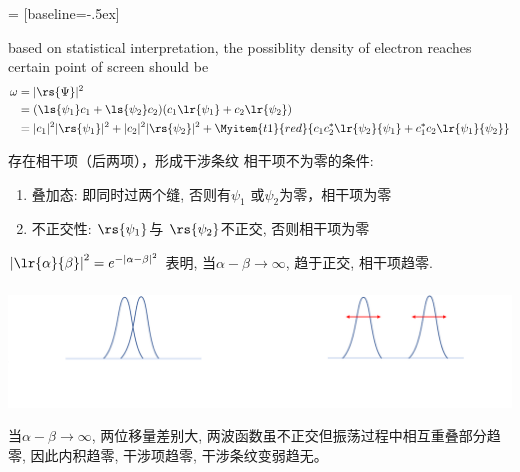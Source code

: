 \begin{frame}
     = [baseline=-.5ex]
    \begin{itemize}
        \Item based on statistical interpretation, the possiblity density of electron reaches certain point of screen should be
        \begin{equation*}
        \begin{split}
            \omega &=|\rs{\Psi}|^2 \\
            &= (\ls{\psi_1}c_1 + \ls{\psi_2}c_2 ) (c_1 \lr{\psi_1}+ c_2\lr{\psi_2}) \\
            & = |c_1|^2 |\rs{\psi_1}|^2 + |c_2|^2 |\rs{\psi_2}|^2  
            + \Myitem{t1}{red}{c_1 c_2 ^* \lr{\psi_2}{\psi_1} + c_1 ^* c_2 \lr{\psi_1}{\psi_2} } \\
        \end{split} 
        \end{equation*}
    \end{itemize}
    \begin{itemize}
        \Item 存在相干项（后两项），形成干涉条纹
        \Item 相干项不为零的条件: 
        \begin{enumerate}
            \item 叠加态: 即同时过两个缝, 否则有$\psi_1$ 或$\psi_2$为零，相干项为零
            \item 不正交性: $\rs{\psi_1}$与 $\rs{\psi_2}$不正交, 否则相干项为零
        \end{enumerate}
        \Item $\left|\lr{\alpha}{\beta} \right|^2 = e^{-  \left| \alpha - \beta\right|^2}$ 表明, 当$\alpha - \beta \to \infty $, 
        趋于正交, 相干项趋零.
    \end{itemize}
\end{frame}

\begin{frame}
 \frametitle{}
   \begin{center}
        \includegraphics[width=1.0\textwidth]{figs/11.png}
   \end{center}
 当$\alpha - \beta \to \infty $, 两位移量差别大, 两波函数虽不正交但振荡过程中相互重叠部分趋零, 因此内积趋零, 干涉项趋零, 干涉条纹变弱趋无。
 
\end{frame}

